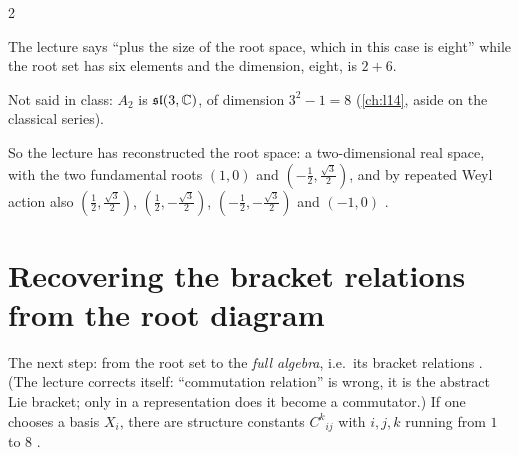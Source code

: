 \begin{paracol}{2}
\begin{coursenote}
The lecture says ``plus the size of the root space, which in this case is eight'' while the root set has six elements and the dimension, eight, is $2+6$. 
\end{coursenote}
\begin{aside}[$A_2=\mathfrak{sl}(3,\C)$]
Not said in class: $A_2$ is $\mathfrak{sl}(3,\mathbb{C})$, of dimension $3^2-1=8$ (\cref{ch:l14}, aside on the classical series). 
\end{aside}
So the lecture has reconstructed the root space: a two-dimensional real space, with the two fundamental roots $(1,0)$ and $(-\frac12,\frac{\sqrt3}2)$, and by repeated Weyl action also $(\frac12,\frac{\sqrt3}2)$, $(\frac12,-\frac{\sqrt3}2)$, $(-\frac12,-\frac{\sqrt3}2)$ and $(-1,0)$  .

\section{Recovering the bracket relations from the root diagram}\label{sec:sa-reconstruct}

The next step: from the root set to the \emph{full algebra}, i.e.\ its bracket relations  . (The lecture corrects itself: ``commutation relation'' is wrong, it is the abstract Lie bracket; only in a representation does it become a commutator.) If one chooses a basis $X_i$, there are structure constants $C^k{}_{ij}$ with $i,j,k$ running from $1$ to $8$ .


\end{paracol}
